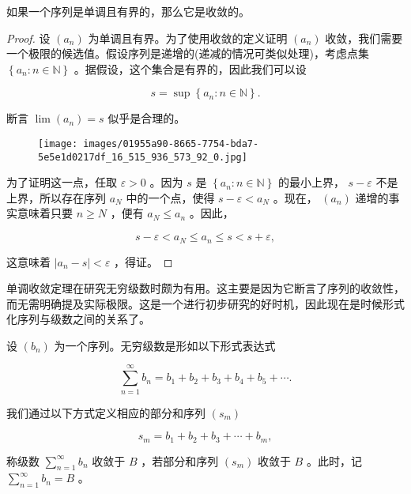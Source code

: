 \begin{Thm}[单调收敛定理]
  \label{thm:2.4.2}
  如果一个序列是单调且有界的，那么它是收敛的。
\end{Thm}

\begin{proof}
设 \(\left( {a}_{n}\right)\) 为单调且有界。为了使用收敛的定义证明 \(\left( {a}_{n}\right)\) 收敛，我们需要一个极限的候选值。假设序列是递增的(递减的情况可类似处理)，考虑点集 \(\left\{  {{a}_{n} : n \in  \mathbb{N}}\right\}\) 。据假设，这个集合是有界的，因此我们可以设

\[
s = \sup \left\{  {{a}_{n} : n \in  \mathbb{N}}\right\}  .
\]

断言 \(\lim \left( {a}_{n}\right)  = s\) 似乎是合理的。

\begin{figure}[h]
  \centering
  \texttt{[image: images/01955a90-8665-7754-bda7-5e5e1d0217df\_16\_515\_936\_573\_92\_0.jpg]}
\end{figure}


为了证明这一点，任取 \(\varepsilon  > 0\) 。因为 \(s\) 是 \(\left\{  {{a}_{n} : n \in  \mathbb{N}}\right\}\) 的最小上界， \(s - \varepsilon\) 不是上界，所以存在序列 \({a}_{N}\) 中的一个点，使得 \(s - \varepsilon  < {a}_{N}\) 。现在， \(\left( {a}_{n}\right)\) 递增的事实意味着只要 \(n \geq  N\) ，便有 \({a}_{N} \leq  {a}_{n}\) 。因此，

\[
s - \varepsilon  < {a}_{N} \leq  {a}_{n} \leq  s < s + \varepsilon ,
\]

这意味着 \(\left| {{a}_{n} - s}\right|  < \varepsilon\) ，得证。  
\end{proof}

单调收敛定理在研究无穷级数时颇为有用。这主要是因为它断言了序列的收敛性，而无需明确提及实际极限。这是一个进行初步研究的好时机，因此现在是时候形式化序列与级数之间的关系了。

\begin{Def}
  \label{def:2.4.3}
  设 \(\left( {b}_{n}\right)\) 为一个序列。无穷级数是形如以下形式表达式

\[
\mathop{\sum }\limits_{{n = 1}}^{\infty }{b}_{n} = {b}_{1} + {b}_{2} + {b}_{3} + {b}_{4} + {b}_{5} + \cdots .
\]

我们通过以下方式定义相应的部分和序列 \(\left( {s}_{m}\right)\)

\[
{s}_{m} = {b}_{1} + {b}_{2} + {b}_{3} + \cdots  + {b}_{m},
\]

称级数 \(\mathop{\sum }\limits_{{n = 1}}^{\infty }{b}_{n}\) 收敛于 \(B\) ，若部分和序列 \(\left( {s}_{m}\right)\) 收敛于 \(B\) 。此时，记 \(\mathop{\sum }\limits_{{n = 1}}^{\infty }{b}_{n} = B\) 。
\end{Def}

